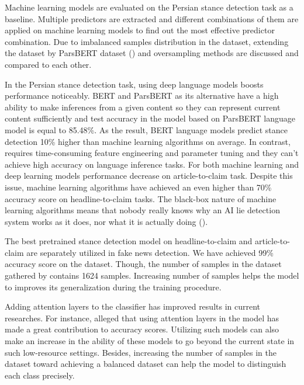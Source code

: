 Machine learning models are evaluated on the Persian stance detection task as a baseline. Multiple predictors are extracted and different combinations of them are applied on machine learning models to find out the most effective predictor combination. Due to imbalanced samples distribution in the \cite{stance_persian} dataset, extending the dataset by ParsBERT dataset (\cite{parsbert}) and oversampling methods are discussed and compared to each other.

In the Persian stance detection task, using deep language models boosts performance noticeably. BERT and ParsBERT as its alternative have a high ability to make inferences from a given content so they can represent current content sufficiently and test accuracy in the model based on ParsBERT language model is equal to 85.48\%. As the result,  BERT language models predict stance detection 10\% higher than machine learning algorithms on average. In contrast, requires time-consuming feature engineering and parameter tuning and they can't achieve high accuracy on language inference tasks. For both machine learning and deep learning models performance decrease on article-to-claim task. Despite this issue, machine learning algorithms have achieved an even higher than 70\% accuracy score on headline-to-claim tasks. The black-box nature of machine learning algorithms means that nobody really knows why an AI lie detection system works as it does, nor what it is actually doing (\cite{book_fake}). 

The best pretrained stance detection model on headline-to-claim and article-to-claim are separately utilized in fake news detection. We have achieved 99\% accuracy score on the \cite{stance_persian} dataset. Though, the number of samples in the dataset gathered by \cite{stance_persian} contains 1624 samples. Increasing number of samples helps the model to improves its generalization during the training procedure.

Adding attention layers to the classifier has improved results in current researches. For instance, \cite{book_disinformation} alleged that using attention layers in the model has made a great contribution to accuracy scores. Utilizing such models can also make an increase in the ability of these models to go beyond the current state in such low-resource settings. Besides, increasing the number of samples in the \cite{stance_persian} dataset toward achieving a balanced dataset can help the model to distinguish each class precisely. 
 
 
 